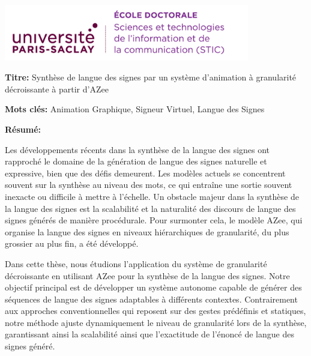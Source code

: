 \documentclass[english,12pt,a4paper]{book}
\begin{document}
\lhead{}
\rhead{}
\rfoot{}
\cfoot{}
\lfoot{}

\noindent 
\includegraphics[height=2.45cm]{logo_ups_STIC.png}
\vspace{1cm}
\selectfont

\small

\begin{mdframed}[linecolor=Prune,linewidth=1]

\textbf{Titre:} Synthèse de langue des signes par un système d'animation à granularité décroissante à partir d'AZee

\noindent \textbf{Mots clés:} Animation Graphique, Signeur Virtuel, Langue des Signes

\vspace{-.5cm}
\begin{multicols}{2}
\noindent \textbf{Résumé:}

Les développements récents dans la synthèse de la langue des signes ont rapproché le domaine de la génération de langue des signes naturelle et expressive, bien que des défis demeurent. Les modèles actuels se concentrent souvent sur la synthèse au niveau des mots, ce qui entraîne une sortie souvent inexacte ou difficile à mettre à l'échelle. Un obstacle majeur dans la synthèse de la langue des signes est la scalabilité et la naturalité des discours de langue des signes générés de manière procédurale. Pour surmonter cela, le modèle AZee, qui organise la langue des signes en niveaux hiérarchiques de granularité, du plus grossier au plus fin, a été développé.

Dans cette thèse, nous étudions l'application du système de granularité décroissante en utilisant AZee pour la synthèse de la langue des signes. Notre objectif principal est de développer un système autonome capable de générer des séquences de langue des signes adaptables à différents contextes. Contrairement aux approches conventionnelles qui reposent sur des gestes prédéfinis et statiques, notre méthode ajuste dynamiquement le niveau de granularité lors de la synthèse, garantissant ainsi la scalabilité ainsi que l'exactitude de l'énoncé de langue des signes généré.


\end{multicols}
\end{mdframed}
\end{document}
